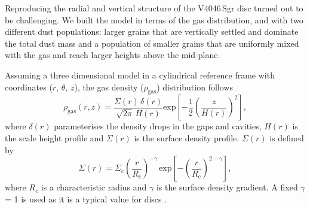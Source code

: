 \documentclass[letters,usenatbib,times]{mnras}
\begin{document}
Reproducing the radial and vertical structure of the V4046\,Sgr disc turned out to be challenging. We built the model in terms of the gas distribution, and with two different dust populations: larger grains that are vertically settled and dominate the total dust mass and a population of smaller grains that are uniformly mixed with the gas and reach larger heights above the mid-plane. 

Assuming a three dimensional model in a cylindrical reference frame with coordinates ($r$, $\theta$, $z$), the gas density ($\rho_{\mathrm{gas}}$) distribution follows
\begin{equation}
  \rho_{\mathrm{gas}}(r,z) =\frac{\Sigma(r) \,\delta(r)}{\sqrt{2\pi} \, H(r)} \mathrm{exp}\left[-\frac{1}{2} \left(\frac{z}{H(r)}\right)^2\right],
\end{equation}
where $\delta(r)$ parameterises the density drops in the gaps and cavities, $H(r)$ is the scale height profile and $\Sigma(r)$ is the surface density profile. $\Sigma(r)$ is defined by
\begin{equation}
  \Sigma(r) = \Sigma_\mathrm{c} \left(\frac{r}{R_\mathrm{c}}\right)^{-\gamma}  \, \mathrm{exp}\left[-\left(\frac{r}{R_\mathrm{c}}\right)^{2-\gamma}\right],
\end{equation}
where $R_c$ is a characteristic radius and $\gamma$ is the surface density gradient. A fixed $\gamma$ = 1 is used as it is a typical value for discs \citep{Andrews_2009,Andrews_2010}. 

\end{document}
